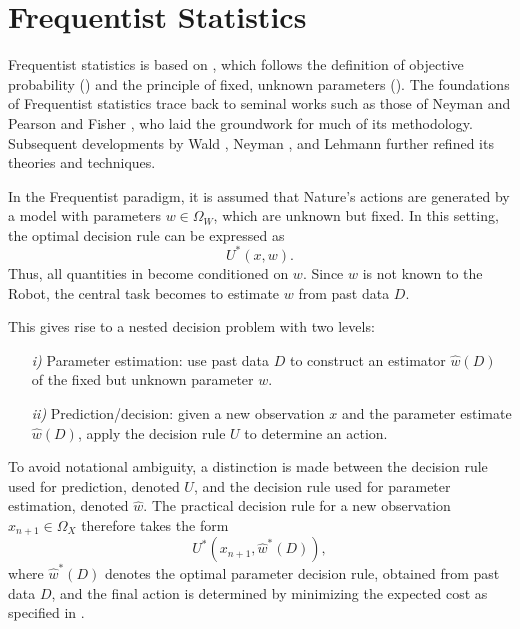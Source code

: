 \section{Frequentist Statistics}
\label{chp:freq}
Frequentist statistics is based on , which follows the definition of objective probability () and the principle of fixed, unknown parameters (). The foundations of Frequentist statistics trace back to seminal works such as those of Neyman and Pearson \citep{Neyman1928OnSR} and Fisher \citep{fisher1925statistical}, who laid the groundwork for much of its methodology. Subsequent developments by Wald \citep{Wald1945Sequential}, Neyman \citep{Neyman1948Consistent}, and Lehmann \citep{lehmann1986testing} further refined its theories and techniques.\newline

In the Frequentist paradigm, it is assumed that Nature's actions are generated by a model with parameters $w \in \Omega_W$, which are unknown but fixed. In this setting, the optimal decision rule can be expressed as
\begin{equation}
	U^*(x,w).
\end{equation}
Thus, all quantities in  become conditioned on $w$. Since $w$ is not known to the Robot, the central task becomes to estimate $w$ from past data $D$. 

This gives rise to a nested decision problem with two levels:
\begin{enumerate}
	\item[\textit{i)}] Parameter estimation: use past data $D$ to construct an estimator $\hat{w}(D)$ of the fixed but unknown parameter $w$.
	\item[\textit{ii)}] Prediction/decision: given a new observation $x$ and the parameter estimate $\hat{w}(D)$, apply the decision rule $U$ to determine an action.
\end{enumerate}

To avoid notational ambiguity, a distinction is made between the decision rule used for prediction, denoted $U$, and the decision rule used for parameter estimation, denoted $\hat{w}$. The practical decision rule for a new observation $x_{n+1} \in \Omega_X$ therefore takes the form
\begin{equation}
	U^*(x_{n+1}, \hat{w}^*(D)),
\end{equation}
where $\hat{w}^*(D)$ denotes the optimal parameter decision rule, obtained from past data $D$, and the final action is determined by minimizing the expected cost as specified in .



